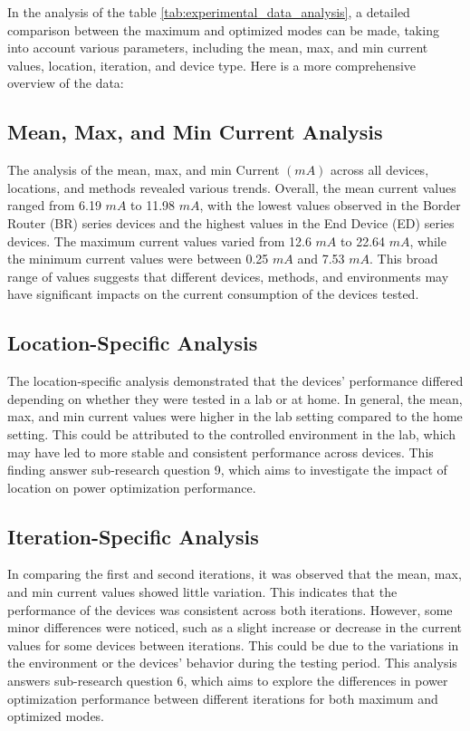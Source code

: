 In the analysis of the table \ref{tab:experimental_data_analysis}, a detailed comparison between the maximum and optimized modes can be made, taking into account various parameters, including the mean, max, and min current values, location, iteration, and device type. Here is a more comprehensive overview of the data:


\subsection{Mean, Max, and Min Current Analysis}

The analysis of the mean, max, and min Current $(mA)$ across all devices, locations, and methods revealed various trends. Overall, the mean current values ranged from 6.19 $mA$ to 11.98 $mA$, with the lowest values observed in the Border Router (BR) series devices and the highest values in the End Device (ED) series devices. The maximum current values varied from 12.6 $mA$ to 22.64 $mA$, while the minimum current values were between 0.25 $mA$ and 7.53 $mA$. This broad range of values suggests that different devices, methods, and environments may have significant impacts on the current consumption of the devices tested.


\subsection{Location-Specific Analysis}

The location-specific analysis demonstrated that the devices' performance differed depending on whether they were tested in a lab or at home. In general, the mean, max, and min current values were higher in the lab setting compared to the home setting. This could be attributed to the controlled environment in the lab, which may have led to more stable and consistent performance across devices. This finding answer sub-research question 9, which aims to investigate the impact of location on power optimization performance.


\subsection{Iteration-Specific Analysis}

In comparing the first and second iterations, it was observed that the mean, max, and min current values showed little variation. This indicates that the performance of the devices was consistent across both iterations. However, some minor differences were noticed, such as a slight increase or decrease in the current values for some devices between iterations. This could be due to the variations in the environment or the devices' behavior during the testing period. This analysis answers sub-research question 6, which aims to explore the differences in power optimization performance between different iterations for both maximum and optimized modes.


